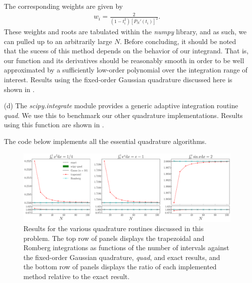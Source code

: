 {The corresponding weights are given by
\begin{align}
    w_{i} = \frac{2}{(1 - t_{i}^2) [P_{N}'(t_{i})]^2}
.\end{align}
These weights and roots are tabulated within the \textit{numpy} library, and as such, we can pulled up to an arbitrarily large $N$.
Before concluding, it should be noted that the sucess of this method depends on the behavior of our integrand.
That is, our function and its derivatives should be reasonably smooth in order to be well approximated by a sufficiently low-order polynomial over the integration range of interest.
Results using the fixed-order Gaussian quadrature discussed here is shown in .

(d) The \textit{scipy.integrate} module provides a generic adaptive integration routine \textit{quad}.
We use this to benchmark our other quadrature implementations.
Results using this function are shown in .


The code below implements all the essential quadrature algorithms.


\begin{figure}[h!tb]
    \centering
    \includegraphics[width=\textwidth]{prob1.pdf}
    \caption{Results for the various quadrature routines discussed in this problem. The top row of panels displays the trapezoidal and Romberg integrations as functions of the number of intervals against the fixed-order Gaussian quadrature, \textit{quad}, and exact results, and the bottom row of panels displays the ratio of each implemented method relative to the exact result.}
    \label{fig:prob1}
\end{figure}


}



